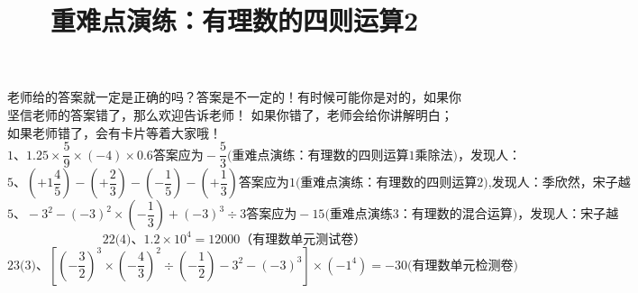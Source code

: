 \documentclass[fleqn]{article}
\title{重难点演练：有理数的四则运算2}
\begin{document}
  \hspace{6cm}{\Large 错误答案修正}
  
	\noindent 老师给的答案就一定是正确的吗？答案是不一定的！有时候可能你是对的，如果你坚信老师的答案错了，那么欢迎告诉老师！
	如果你错了，老师会给你讲解明白；如果老师错了，会有卡片等着大家哦！
	\[\text{1、}1.25\times\frac59\times(-4)\times0.6 \text{答案应为}-\frac53 \text{(重难点演练：有理数的四则运算1乘除法)，发现人：}\]
  \[\text{5、} (+1\frac45)-(+\frac23)-(-\frac15)-(+\frac13)\text{答案应为}1\text{(重难点演练：有理数的四则运算2),发现人：季欣然，宋子越}\]
  \[\text{5、}-3^2-(-3)^2\times(-\frac13)+(-3)^3\div3\text{答案应为}-15\text{(重难点演练3：有理数的混合运算)，发现人：宋子越}\]
  \[\text{22(4)、}1.2\times10^4=12000\text{（有理数单元测试卷）}\]
  \[\text{23(3)、}[(-\frac32)^3\times(-\frac43)^2\div(-\frac12)-3^2-(-3)^3]\times(-1^4)=-30\text{(有理数单元检测卷)}\]
\end{document}
